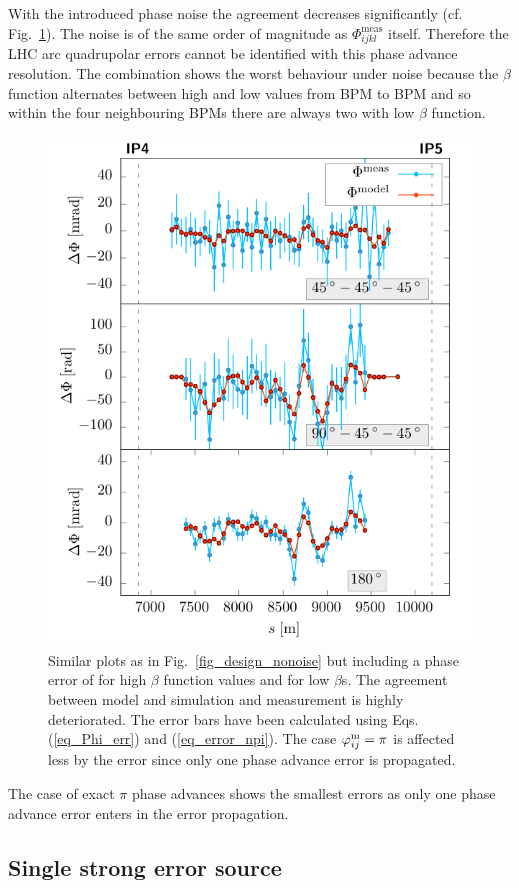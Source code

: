 With the introduced phase noise the agreement decreases significantly (cf. Fig.~\ref{fig_design_noise}). The noise is of the same order of magnitude
as $\Phi_{ijkl}^\text{meas}$ itself.
Therefore the LHC arc quadrupolar errors cannot be identified with this phase advance resolution.
The combination  shows the worst behaviour under noise because the $\beta$
function alternates between high and low values from BPM to BPM and so within the four neighbouring
BPMs there are always two with low $\beta$ function.
%
\begin{figure}
  \centering
  \includegraphics[width=.7\linewidth]{sim_noise}
  \caption{
    Similar plots as in Fig.~\ref{fig_design_nonoise} but including a phase error of \noiserms{} for
    high $\beta$ function values and \highnoise{} for low $\beta$s.
    The agreement between model and simulation and measurement is highly deteriorated.
    The error bars have been calculated using Eqs. (\ref{eq_Phi_err}) and (\ref{eq_error_npi}).
    The case $\varphi_{ij}^\text{m}=\pi$ is affected less by the error since only one phase advance error
    is propagated.
  }
  \label{fig_design_noise}
\end{figure}
%
The case of exact $\pi$ phase advances shows the smallest errors as only one phase advance
error enters in the error propagation.

\subsection{Single strong error source}

